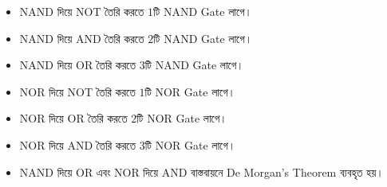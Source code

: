 \begin{itemize}[label={{\bulletfont\bfseries *}}, leftmargin=*, nosep]

    \item \textenglish{NAND} দিয়ে \textenglish{NOT}
    তৈরি করতে \(1\)টি \textenglish{NAND Gate} লাগে।

    \item \textenglish{NAND} দিয়ে \textenglish{AND}
    তৈরি করতে \(2\)টি \textenglish{NAND Gate} লাগে।

    \item \textenglish{NAND} দিয়ে \textenglish{OR}
    তৈরি করতে \(3\)টি \textenglish{NAND Gate} লাগে।

    \item \textenglish{NOR} দিয়ে \textenglish{NOT}
    তৈরি করতে \(1\)টি \textenglish{NOR Gate} লাগে।

    \item \textenglish{NOR} দিয়ে \textenglish{OR}
    তৈরি করতে \(2\)টি \textenglish{NOR Gate} লাগে।

    \item \textenglish{NOR} দিয়ে \textenglish{AND}
    তৈরি করতে \(3\)টি \textenglish{NOR Gate} লাগে।

    \item \textenglish{NAND} দিয়ে \textenglish{OR}
    এবং \textenglish{NOR} দিয়ে \textenglish{AND}
    বাস্তবায়নে \textenglish{De Morgan's Theorem} ব্যবহৃত হয়।

\end{itemize}

\par\endgroup




